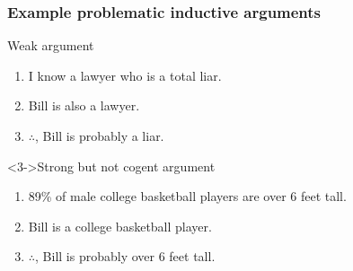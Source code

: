 \documentclass[10pt,letterpaper,xcolor=dvipsnames,handout]{beamer}
\begin{document}
\begin{frame}
  \frametitle{Example problematic inductive arguments}
  
  \begin{block}{Weak argument }
  \begin{enumerate}
    \item I know a lawyer who is a total liar. 
    \item Bill is also a lawyer. 
    \item $\therefore$, Bill is probably a liar. 
  \end{enumerate}
  \end{block}
  
  \begin{block}<3->{Strong but not cogent argument }
  \begin{enumerate}
    \item 89\% of male college basketball players are over 6 feet tall. 
    \item Bill is a college basketball player. 
    \item $\therefore$, Bill is probably over 6 feet tall. 
  \end{enumerate}
  \end{block}
\end{frame}
\end{document}
